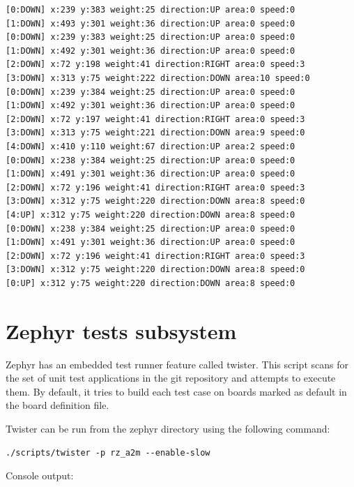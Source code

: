 \documentclass[11pt,a4paper,oneside]{article}
\begin{document}
\begin{lstlisting}
[0:DOWN] x:239 y:383 weight:25 direction:UP area:0 speed:0
[1:DOWN] x:493 y:301 weight:36 direction:UP area:0 speed:0
[0:DOWN] x:239 y:383 weight:25 direction:UP area:0 speed:0
[1:DOWN] x:492 y:301 weight:36 direction:UP area:0 speed:0
[2:DOWN] x:72 y:198 weight:41 direction:RIGHT area:0 speed:3
[3:DOWN] x:313 y:75 weight:222 direction:DOWN area:10 speed:0
[0:DOWN] x:239 y:384 weight:25 direction:UP area:0 speed:0
[1:DOWN] x:492 y:301 weight:36 direction:UP area:0 speed:0
[2:DOWN] x:72 y:197 weight:41 direction:RIGHT area:0 speed:3
[3:DOWN] x:313 y:75 weight:221 direction:DOWN area:9 speed:0
[4:DOWN] x:410 y:110 weight:67 direction:UP area:2 speed:0
[0:DOWN] x:238 y:384 weight:25 direction:UP area:0 speed:0
[1:DOWN] x:491 y:301 weight:36 direction:UP area:0 speed:0
[2:DOWN] x:72 y:196 weight:41 direction:RIGHT area:0 speed:3
[3:DOWN] x:312 y:75 weight:220 direction:DOWN area:8 speed:0
[4:UP] x:312 y:75 weight:220 direction:DOWN area:8 speed:0
[0:DOWN] x:238 y:384 weight:25 direction:UP area:0 speed:0
[1:DOWN] x:491 y:301 weight:36 direction:UP area:0 speed:0
[2:DOWN] x:72 y:196 weight:41 direction:RIGHT area:0 speed:3
[3:DOWN] x:312 y:75 weight:220 direction:DOWN area:8 speed:0
[0:UP] x:312 y:75 weight:220 direction:DOWN area:8 speed:0
\end{lstlisting}

\section{Zephyr tests subsystem}\label{zephyr-tests-subsystem}

Zephyr has an embedded test runner feature called twister. This script
scans for the set of unit test applications in the git repository and
attempts to execute them. By default, it tries to build each test case
on boards marked as default in the board definition file.

Twister can be run from the zephyr directory using the following
command:

\begin{lstlisting}
./scripts/twister -p rz_a2m --enable-slow
\end{lstlisting}

Console output:
\end{document}

